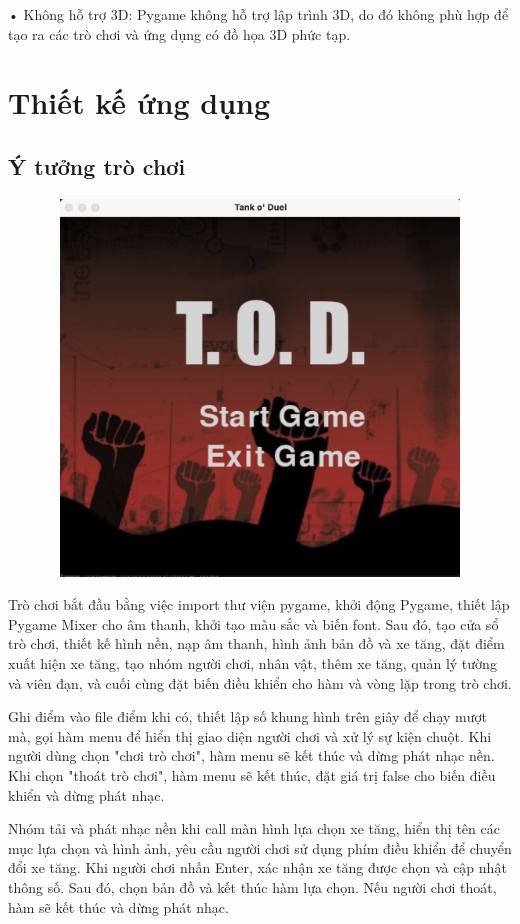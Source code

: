 \documentclass[a4paper]{article}
\begin{document}
	•	Không hỗ trợ 3D: Pygame không hỗ trợ lập trình 3D, do đó không phù hợp để tạo ra các trò chơi và ứng dụng có đồ họa 3D phức tạp.
	
	
\newpage
\section{Thiết kế ứng dụng}
	\subsection{Ý tưởng trò chơi}
	\includegraphics[width=15cm,height=10cm]{maingame.png}

	Trò chơi bắt đầu bằng việc import thư viện pygame, khởi động Pygame, thiết lập Pygame Mixer cho âm thanh, khởi tạo màu sắc và biến font. Sau đó, tạo cửa sổ trò chơi, thiết kế hình nền, nạp âm thanh, hình ảnh bản đồ và xe tăng, đặt điểm xuất hiện xe tăng, tạo nhóm người chơi, nhân vật, thêm xe tăng, quản lý tường và viên đạn, và cuối cùng đặt biến điều khiển cho hàm và vòng lặp trong trò chơi.

        Ghi điểm vào file điểm khi có, thiết lập số khung hình trên giây để chạy mượt mà, gọi hàm menu để hiển thị giao diện người chơi và xử lý sự kiện chuột. Khi người dùng chọn "chơi trò chơi", hàm menu sẽ kết thúc và dừng phát nhạc nền. Khi chọn "thoát trò chơi", hàm menu sẽ kết thúc, đặt giá trị false cho biến điều khiển và dừng phát nhạc.

        Nhóm tải và phát nhạc nền khi call màn hình lựa chọn xe tăng, hiển thị tên các mục lựa chọn và hình ảnh, yêu cầu người chơi sử dụng phím điều khiển để chuyển đổi xe tăng. Khi người chơi nhấn Enter, xác nhận xe tăng được chọn và cập nhật thông số. Sau đó, chọn bản đồ và kết thúc hàm lựa chọn. Nếu người chơi thoát, hàm sẽ kết thúc và dừng phát nhạc.
        
\end{document}
